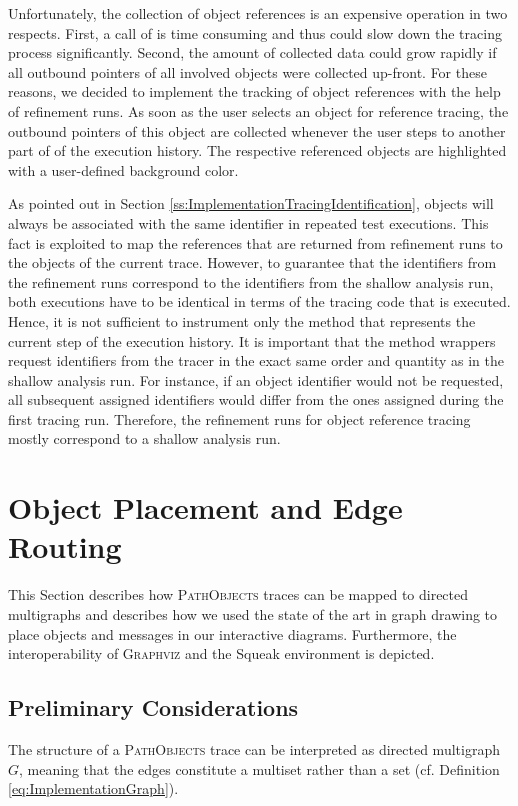 Unfortunately, the collection of object references is an expensive operation in two respects.
First, a call of  is time consuming and thus could slow down the tracing process significantly.
Second, the amount of collected data could grow rapidly if all outbound pointers of all involved objects were collected up-front.
For these reasons, we decided to implement the tracking of object references with the help of refinement runs.
As soon as the user selects an object for reference tracing, the outbound pointers of this object are collected whenever the user steps to another part of of the execution history.
The respective referenced objects are highlighted with a user-defined background color.

As pointed out in Section \ref{ss:ImplementationTracingIdentification}, objects will always be associated with the same identifier in repeated test executions.
This fact is exploited to map the references that are returned from refinement runs to the objects of the current trace.
However, to guarantee that the identifiers from the refinement runs correspond to the identifiers from the shallow analysis run, both executions have to be identical in terms of the tracing code that is executed.
Hence, it is not sufficient to instrument only the method that represents the current step of the execution history.
It is important that the method wrappers request identifiers from the tracer in the exact same order and quantity as in the shallow analysis run.
For instance, if an object identifier would not be requested, all subsequent assigned identifiers would differ from the ones assigned during the first tracing run.
Therefore, the refinement runs for object reference tracing mostly correspond to a shallow analysis run.

\section[Object Placement and Edge Routing]{Object Placement and Edge Routing%
}
\label{s:ImplementationLayouting}

This Section describes how \textsc{PathObjects} traces can be mapped to directed multigraphs and describes how we used the state of the art in graph drawing to place objects and messages in our interactive diagrams.
Furthermore, the interoperability of \textsc{Graphviz} and the Squeak environment is depicted.

\subsection{Preliminary Considerations}
The structure of a \textsc{PathObjects} trace can be interpreted as directed multigraph $G$, meaning that the edges constitute a multiset rather than a set (cf. Definition \ref{eq:ImplementationGraph}).

